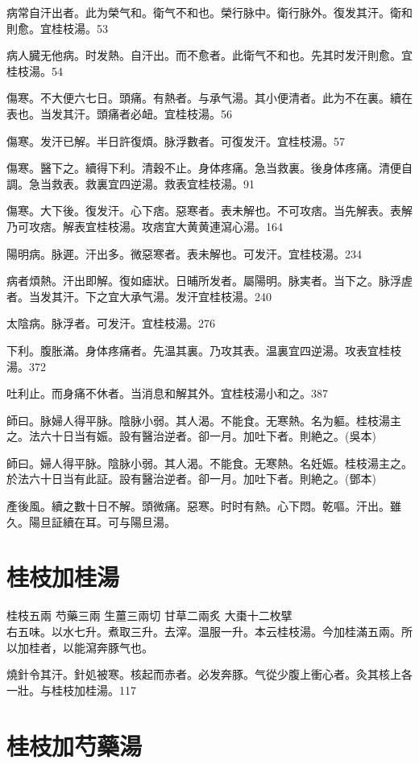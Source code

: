 \documentclass[b5paper,twoside,zihao=-4,UTF8]{ctexbook}
\begin{document}
病常自汗出者。此为榮气和。衛气不和也。榮行脉中。衛行脉外。復发其汗。衛和則愈。宜桂枝湯。53

病人臓无他病。时发熱。自汗出。而不愈者。此衛气不和也。先其时发汗則愈。宜桂枝湯。54

傷寒。不大便六七日。頭痛。有熱者。与承气湯。其小便清者。此为不在裏。續在表也。当发其汗。頭痛者必衄。宜桂枝湯。56

傷寒。发汗已解。半日許復煩。脉浮數者。可復发汗。宜桂枝湯。57

傷寒。醫下之。續得下利。清穀不止。身体疼痛。急当救裏。後身体疼痛。清便自調。急当救表。救裏宜四逆湯。救表宜桂枝湯。91

傷寒。大下後。復发汗。心下痞。惡寒者。表未解也。不可攻痞。当先解表。表解乃可攻痞。解表宜桂枝湯。攻痞宜大黄黄連瀉心湯。164

陽明病。脉遲。汗出多。微惡寒者。表未解也。可发汗。宜桂枝湯。234

病者煩熱。汗出即解。復如瘧狀。日晡所发者。屬陽明。脉実者。当下之。脉浮虗者。当发其汗。下之宜{大}承气湯。发汗宜桂枝湯。240

太陰病。脉浮者。可发汗。宜桂枝湯。276

下利。腹{胀}滿。身体疼痛者。先温其裏。乃攻其表。温裏宜四逆湯。攻表宜桂枝湯。372

吐利止。而身痛不休者。当消息和解其外。宜桂枝湯小和之。387

師曰。脉婦人得平脉。陰脉小弱。其人渴。不能食。无寒熱。名为軀。桂枝湯主之。法六十日当有娠。設有醫治逆者。卻一月。加吐下者。則絶之。(吳本)

師曰。婦人得平脉。陰脉小弱。其人渴。不能食。无寒熱。名妊娠。桂枝湯主之。於法六十日当有此証。設有醫治逆者。卻一月。加吐下者。則絶之。(鄧本)

產後風。續之數十日不解。頭微痛。惡寒。时时有熱。心下悶。乾嘔。汗出。雖久。陽旦証續在耳。可与陽旦湯。

\section{桂枝加桂湯}

桂枝{\scriptsize 五兩} 芍藥{\scriptsize 三兩} 生薑{\scriptsize 三兩切} 甘草{\scriptsize 二兩炙} 大棗{\scriptsize 十二枚擘}\\
右五味。以水七升。煮取三升。去滓。温服一升。本云桂枝湯。今加桂滿五兩。所以加桂者，以能瀉奔豚气也。

燒針令其汗。針処被寒。核起而赤者。必发奔豚。气從少腹上衝心者。灸其核上各一壯。与桂枝加桂湯。117

\section{桂枝加芍藥湯}
\end{document}
